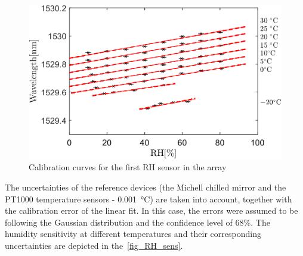 \begin{figure}[!h]
\centering
\includegraphics[width=0.8\columnwidth]{Chapter5/images/RH1.png}
\caption{Calibration curves for the first \gls{RH} sensor in the array}
\label{fig_array_calibration}
\end{figure}
\newpage
The uncertainties of the reference devices (the Michell chilled mirror and the PT1000 temperature sensors - \SI{0.001}{\celsius}) are taken into account, together with the calibration error of the linear fit. In this case, the errors were assumed to be following the Gaussian distribution and the confidence level of 68\%. The humidity sensitivity at different temperatures and their corresponding uncertainties are depicted in the~\ref{fig_RH_sens}. 

